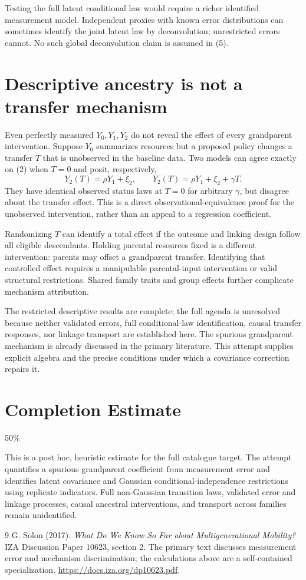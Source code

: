 \documentclass[11pt,a4paper]{article}
\begin{document}
Testing the full latent conditional law would require a richer identified measurement model. Independent proxies with known error distributions can sometimes identify the joint latent law by deconvolution; unrestricted errors cannot. No such global deconvolution claim is assumed in (5).
\section{Descriptive ancestry is not a transfer mechanism}
Even perfectly measured $Y_0,Y_1,Y_2$ do not reveal the effect of every grandparent intervention. Suppose $Y_0$ summarizes resources but a proposed policy changes a transfer $T$ that is unobserved in the baseline data. Two models can agree exactly on (2) when $T=0$ and posit, respectively,
\[
 Y_2(T)=\rho Y_1+\xi_2,\qquad
 Y_2(T)=\rho Y_1+\xi_2+\gamma T.
\]
They have identical observed status laws at $T=0$ for arbitrary $\gamma$, but disagree about the transfer effect. This is a direct observational-equivalence proof for the unobserved intervention, rather than an appeal to a regression coefficient.

Randomizing $T$ can identify a total effect if the outcome and linking design follow all eligible descendants. Holding parental resources fixed is a different intervention: parents may offset a grandparent transfer. Identifying that controlled effect requires a manipulable parental-input intervention or valid structural restrictions. Shared family traits and group effects further complicate mechanism attribution.

The restricted descriptive results are complete; the full agenda is unresolved because neither validated errors, full conditional-law identification, causal transfer responses, nor linkage transport are established here. The spurious grandparent mechanism is already discussed in the primary literature. This attempt supplies explicit algebra and the precise conditions under which a covariance correction repairs it.

\section{Completion Estimate}
50\%

This is a post hoc, heuristic estimate for the full catalogue target.
The attempt quantifies a spurious grandparent coefficient from measurement error and identifies latent covariance and Gaussian conditional-independence restrictions using replicate indicators. Full non-Gaussian transition laws, validated error and linkage processes, causal ancestral interventions, and transport across families remain unidentified.

\begin{thebibliography}{9}
 G. Solon (2017). \emph{What Do We Know So Far about Multigenerational Mobility?} IZA Discussion Paper 10623, section 2.
The primary text discusses measurement error and mechanism discrimination; the calculations above are a self-contained specialization.
\url{https://docs.iza.org/dp10623.pdf}.
\end{thebibliography}
\end{document}
